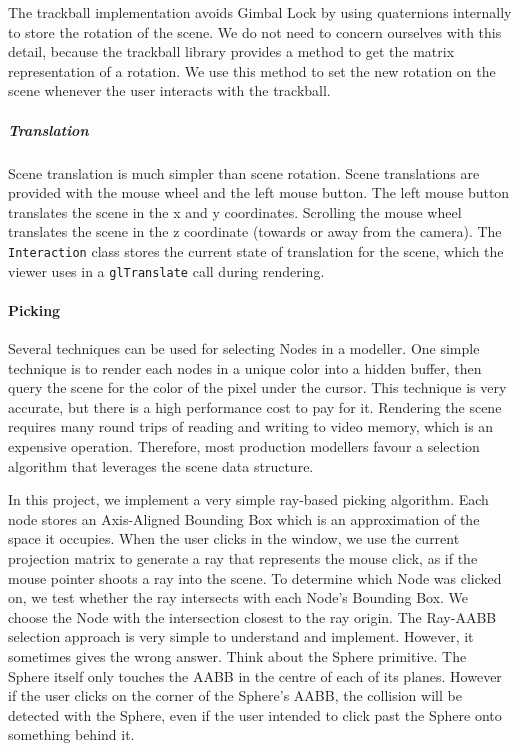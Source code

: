\documentclass[11pt,draft]{article}
\begin{document}
The trackball implementation avoids Gimbal Lock by using quaternions internally to store the rotation of the scene.
We do not need to concern ourselves with this detail, because the trackball library provides a method to get the matrix representation of a rotation.
We use this method to set the new rotation on the scene whenever the user interacts with the trackball.

\subparagraph{Translation}
Scene translation is much simpler than scene rotation. Scene translations are provided with the mouse wheel and the left mouse button. The left mouse
button translates the scene in the x and y coordinates. Scrolling the mouse wheel translates the scene in the z coordinate
(towards or away from the camera).
The \lstinline$Interaction$ class stores the current state of translation for the scene, which the viewer uses in a \lstinline$glTranslate$ call during rendering.

\paragraph{Picking}
Several techniques can be used for selecting Nodes in a modeller. One simple technique is to render each nodes in a unique color into a hidden buffer, then query the scene for the color of the pixel under the cursor.
This technique is very accurate, but there is a high performance cost to pay for it. Rendering the scene requires many round trips of reading and writing to video memory, which is an expensive operation. Therefore, most production
modellers favour a selection algorithm that leverages the scene data structure.

In this project, we implement a very simple ray-based picking algorithm. Each node stores an Axis-Aligned Bounding Box which is an approximation of the
space it occupies. When the user clicks in the window, we use the current projection matrix to generate a ray that represents the mouse click, as if the mouse pointer shoots a ray into the scene.
To determine which Node was clicked on, we test whether the ray intersects with each Node's Bounding Box. We choose the Node with the intersection closest to the ray origin.
The Ray-AABB selection approach is very simple to understand and implement. However, it sometimes gives the wrong answer. Think about the Sphere primitive. The Sphere itself only touches
the AABB in the centre of each of its planes. However if the user clicks on the corner of the Sphere's AABB, the collision will be detected with the Sphere, even if the user intended to click
past the Sphere onto something behind it.
\end{document}
